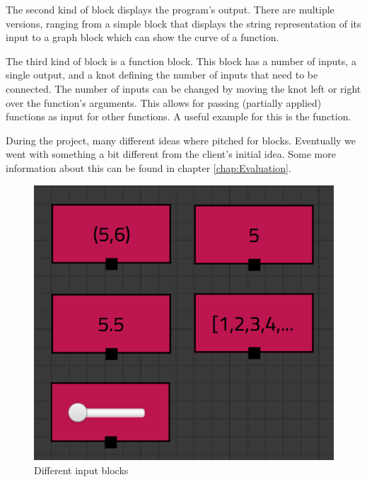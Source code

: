 The second kind of block displays the program's output. 
There are multiple versions, ranging from a simple block that displays the string representation of its input to a graph block which can show the curve of a function. 

The third kind of block is a function block. This block has a number of inputs, a single output, and a knot defining the number of inputs that need to be connected. 
The number of inputs can be changed by moving the knot left or right over the function's arguments.
This allows for passing (partially applied) functions as input for other functions. 
A useful example for this is the  function.

During the project, many different ideas where pitched for blocks. Eventually we went with something a bit different from the client's initial idea. Some more information about this can be found in chapter \ref{chap:Evaluation}.

\begin{figure}[p]
	\centering
	\includegraphics[scale=0.5]{Images/blocks-inputs}
	\caption{Different input blocks}
	\label{fig:blocks-inputs}
\end{figure}

